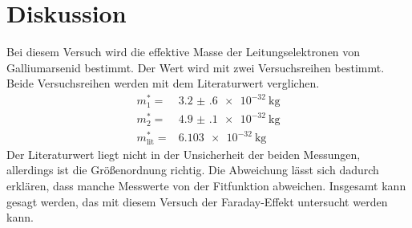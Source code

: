 \section{Diskussion}
\label{sec:Diskussion}
Bei diesem Versuch wird die effektive Masse der Leitungselektronen von Galliumarsenid bestimmt.
Der Wert wird mit zwei Versuchsreihen bestimmt. 
Beide Versuchsreihen werden mit dem Literaturwert \cite{LitWert} verglichen.
\begin{align*}
    m^*_1 =& \SI{3.2(6)e-32}{\kilo\gram}\\
    m^*_2 =& \SI{4.9(1)e-32}{\kilo\gram}\\
    m^*_{\text{lit}}=& \SI{6.103e-32}{\kilo\gram}
\end{align*}
Der Literaturwert liegt nicht in der Unsicherheit der beiden Messungen, allerdings ist die Größenordnung richtig.
Die Abweichung lässt sich dadurch erklären, dass manche Messwerte von der Fitfunktion abweichen. Insgesamt kann gesagt werden, 
das mit diesem Versuch der Faraday-Effekt untersucht werden kann.
